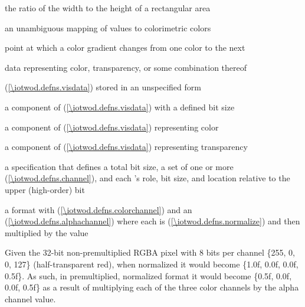 %
the ratio of the width to the height of a rectangular area

%
an unambiguous mapping of values to colorimetric colors

%
point at which a color gradient changes from one color to the next

%
data representing color, transparency, or some combination thereof

%
  (\ref{\iotwod.defns.visdata}) stored in an unspecified form

%
a component of  (\ref{\iotwod.defns.visdata}) with a defined bit size

%
a component of  (\ref{\iotwod.defns.visdata}) representing color

%
a component of  (\ref{\iotwod.defns.visdata}) representing transparency

%
a specification that defines a total bit size, a set of one or more  (\ref{\iotwod.defns.channel}), and each 's role, bit size, and location relative to the upper (high-order) bit

%
a format with  (\ref{\iotwod.defns.colorchannel}) and an  (\ref{\iotwod.defns.alphachannel}) where each  is  (\ref{\iotwod.defns.normalize}) and then multiplied by the   value
\begin{example}
Given the 32-bit non-premultiplied RGBA pixel with 8 bits per channel \{255, 0, 0, 127\} (half-transparent red), when normalized it would become \{1.0f, 0.0f, 0.0f, 0.5f\}. As such, in premultiplied, normalized format it would become \{0.5f, 0.0f, 0.0f, 0.5f\} as a result of multiplying each of the three color channels by the alpha channel value.
\end{example}

